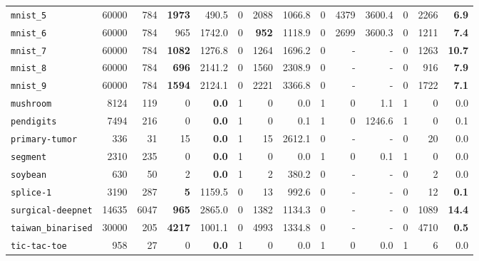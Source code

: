 \begin{tabular}{lccrrrrrrrrrrr}
\texttt{mnist\_5} & \multicolumn{1}{r}{60000} & \multicolumn{1}{r}{784}  & \textbf{1973} & 490.5 & 0 & 2088 & 1066.8 & 0 & 4379 & 3600.4 & 0 & 2266 & \textbf{6.9}\\
\texttt{mnist\_6} & \multicolumn{1}{r}{60000} & \multicolumn{1}{r}{784}  & 965 & 1742.0 & 0 & \textbf{952} & 1118.9 & 0 & 2699 & 3600.3 & 0 & 1211 & \textbf{7.4}\\
\texttt{mnist\_7} & \multicolumn{1}{r}{60000} & \multicolumn{1}{r}{784}  & \textbf{1082} & 1276.8 & 0 & 1264 & 1696.2 & 0 & - & - & 0 & 1263 & \textbf{10.7}\\
\texttt{mnist\_8} & \multicolumn{1}{r}{60000} & \multicolumn{1}{r}{784}  & \textbf{696} & 2141.2 & 0 & 1560 & 2308.9 & 0 & - & - & 0 & 916 & \textbf{7.9}\\
\texttt{mnist\_9} & \multicolumn{1}{r}{60000} & \multicolumn{1}{r}{784}  & \textbf{1594} & 2124.1 & 0 & 2221 & 3366.8 & 0 & - & - & 0 & 1722 & \textbf{7.1}\\
\texttt{mushroom} & \multicolumn{1}{r}{8124} & \multicolumn{1}{r}{119}  & 0 & \textbf{0.0} & 1 & 0 & 0.0 & 1 & 0 & 1.1 & 1 & 0 & 0.0\\
\texttt{pendigits} & \multicolumn{1}{r}{7494} & \multicolumn{1}{r}{216}  & 0 & \textbf{0.0} & 1 & 0 & 0.1 & 1 & 0 & 1246.6 & 1 & 0 & 0.1\\
\texttt{primary-tumor} & \multicolumn{1}{r}{336} & \multicolumn{1}{r}{31}  & 15 & \textbf{0.0} & 1 & 15 & 2612.1 & 0 & - & - & 0 & 20 & 0.0\\
\texttt{segment} & \multicolumn{1}{r}{2310} & \multicolumn{1}{r}{235}  & 0 & \textbf{0.0} & 1 & 0 & 0.0 & 1 & 0 & 0.1 & 1 & 0 & 0.0\\
\texttt{soybean} & \multicolumn{1}{r}{630} & \multicolumn{1}{r}{50}  & 2 & \textbf{0.0} & 1 & 2 & 380.2 & 0 & - & - & 0 & 2 & 0.0\\
\texttt{splice-1} & \multicolumn{1}{r}{3190} & \multicolumn{1}{r}{287}  & \textbf{5} & 1159.5 & 0 & 13 & 992.6 & 0 & - & - & 0 & 12 & \textbf{0.1}\\
\texttt{surgical-deepnet} & \multicolumn{1}{r}{14635} & \multicolumn{1}{r}{6047}  & \textbf{965} & 2865.0 & 0 & 1382 & 1134.3 & 0 & - & - & 0 & 1089 & \textbf{14.4}\\
\texttt{taiwan\_binarised} & \multicolumn{1}{r}{30000} & \multicolumn{1}{r}{205}  & \textbf{4217} & 1001.1 & 0 & 4993 & 1334.8 & 0 & - & - & 0 & 4710 & \textbf{0.5}\\
\texttt{tic-tac-toe} & \multicolumn{1}{r}{958} & \multicolumn{1}{r}{27}  & 0 & \textbf{0.0} & 1 & 0 & 0.0 & 1 & 0 & 0.0 & 1 & 6 & 0.0\\

\end{tabular}
